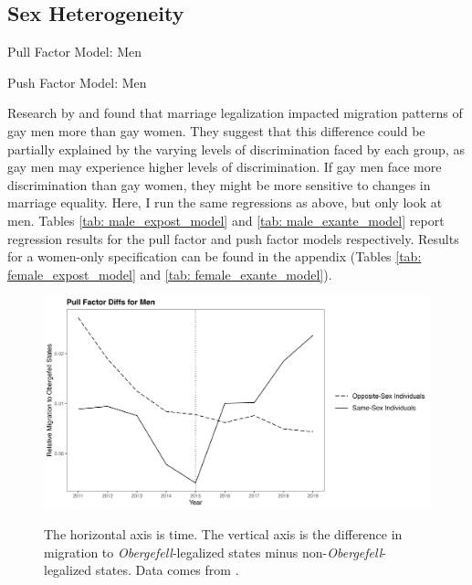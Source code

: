 \documentclass[12pt,letterpaper]{article}
\begin{document}
\subsection{Sex Heterogeneity}
\begin{table}[htbp]
    \centering
    \caption{Pull Factor Model: Men}
    \label{tab: male_expost_model}
    
\end{table}
\begin{table}[htbp]
    \centering
    \caption{Push Factor Model: Men}
    \label{tab: male_exante_model}
    
\end{table}
Research by \citet{1} and \cite{12} found that marriage legalization impacted migration patterns of gay men more than gay women. They suggest that this difference could be partially explained by the varying levels of discrimination faced by each group, as gay men may experience higher levels of discrimination.  If gay men face more discrimination than gay women, they might be more sensitive to changes in marriage equality.
Here, I run the same regressions as above, but only look at men. Tables \ref{tab: male_expost_model} and \ref{tab: male_exante_model} report regression results for the pull factor and push factor models respectively. Results for a women-only specification can be found in the appendix (Tables \ref{tab: female_expost_model} and \ref{tab: female_exante_model}).
\begin{figure}[htbp]
    \centering
    \caption{}
    \label{fig: men_post_diffs}
    \includegraphics[width=.75\linewidth]{outputs/summary_stats/men_post_diffs.png}

    \vspace{0.5em}
    \begin{minipage}{0.75\linewidth}
        \footnotesize The horizontal axis is time. The vertical axis is the difference in migration to \textit{Obergefell}-legalized states minus non-\textit{Obergefell}-legalized states. Data comes from \citet{28}.
    \end{minipage}
\end{figure}
\end{document}
